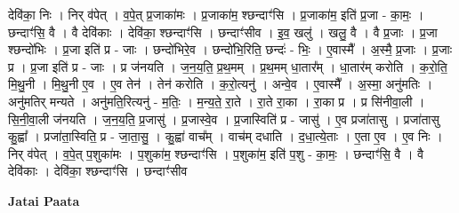 \documentclass[17pt]{extarticle}
\begin{document}
देवि॑का॒ निः । निर् व॑पेत् । व॒पे॒त् प्र॒जाका॑मः । प्र॒जाका॑म॒ श्छन्दाꣳ॑सि । प्र॒जाका॑म॒ इति॑ प्र॒जा - का॒मः॒ । छन्दाꣳ॑सि॒ वै । वै देवि॑काः । देवि॑का॒ श्छन्दाꣳ॑सि । छन्दाꣳ॑सीव । इ॒व॒ खलु॑ । खलु॒ वै । वै प्र॒जाः । प्र॒जा श्छन्दो॑भिः । प्र॒जा इति॑ प्र - जाः । छन्दो॑भिरे॒व । छन्दो॑भि॒रिति॒ छन्दः॑ - भिः॒ । ए॒वास्मै᳚ । अ॒स्मै॒ प्र॒जाः । प्र॒जाः प्र । प्र॒जा इति॑ प्र - जाः । प्र ज॑नयति । ज॒न॒य॒ति॒ प्र॒थ॒मम् । प्र॒थ॒मम् धा॒तार᳚म् । धा॒तार॑म् करोति । क॒रो॒ति॒ मि॒थु॒नी । मि॒थु॒नी ए॒व । ए॒व तेन॑ । तेन॑ करोति । क॒रो॒त्यनु॑ । अन्वे॒व । ए॒वास्मै᳚ । अ॒स्मा॒ अनु॑मतिः । अनु॑मतिर् मन्यते । अनु॑मति॒रित्यनु॑ - म॒तिः॒ । म॒न्य॒ते॒ रा॒ते । रा॒ते रा॒का । रा॒का प्र । प्र सि॑नीवा॒ली । सि॒नी॒वा॒ली ज॑नयति । ज॒न॒य॒ति॒ प्र॒जासु॑ । प्र॒जास्वे॒व । प्र॒जास्विति॑ प्र - जासु॑ । ए॒व प्रजा॑तासु । प्रजा॑तासु कु॒ह्वा᳚ । प्रजा॑ता॒स्विति॒ प्र - जा॒ता॒सु॒ । कु॒ह्वा॑ वाच᳚म् । वाच॑म् दधाति । द॒धा॒त्ये॒ताः । ए॒ता ए॒व । ए॒व निः । निर् व॑पेत् । व॒पे॒त् प॒शुका॑मः । प॒शुका॑म॒ श्छन्दाꣳ॑सि । प॒शुका॑म॒ इति॑ प॒शु - का॒मः॒ । छन्दाꣳ॑सि॒ वै । वै देवि॑काः । देवि॑का॒ श्छन्दाꣳ॑सि । छन्दाꣳ॑सीव \newline

\textbf{Jatai Paata} \newline
\end{document}
